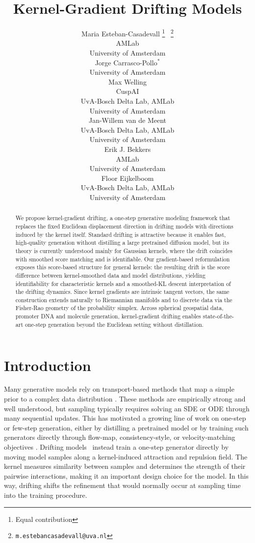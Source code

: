 \documentclass{article}
\title{Kernel-Gradient Drifting Models}
\author{%
  Maria Esteban-Casadevall \thanks{Equal contribution} \, \thanks{ \texttt{m.estebancasadevall@uva.nl}}\\
  AMLab\\
  University of Amsterdam\\
  \And
  Jorge Carrasco-Pollo$^*$  \\
  University of Amsterdam \\
   \AND
   Max Welling \\
   CuspAI \\
  UvA-Bosch Delta Lab, AMLab \\
  University of Amsterdam \\
   \And
   Jan-Willem van de Meent\\
  UvA-Bosch Delta Lab, AMLab \\
  University of Amsterdam \\
     \And
    Erik J. Bekkers \\
    AMLab \\
    University of Amsterdam \\
   \And
   Floor Eijkelboom \\
  UvA-Bosch Delta Lab, AMLab \\
  University of Amsterdam \\
}
\theoremstyle{plain}
\begin{document}
\maketitle
\begin{abstract}
We propose kernel-gradient drifting, a one-step generative modeling framework that replaces the fixed Euclidean displacement direction in drifting models with directions induced by the kernel itself. Standard drifting is attractive because it enables fast, high-quality generation without distilling a large pretrained diffusion model, but its theory is currently understood mainly for Gaussian kernels, where the drift coincides with smoothed score matching and is identifiable. Our gradient-based reformulation exposes this score-based structure for general kernels: the resulting drift is the score difference between kernel-smoothed data and model distributions, yielding identifiability for characteristic kernels and a smoothed-KL descent interpretation of the drifting dynamics. Since kernel gradients are intrinsic tangent vectors, the same construction extends naturally to Riemannian manifolds and to discrete data via the Fisher-Rao geometry of the probability simplex. Across spherical geospatial data, promoter DNA and molecule generation, kernel-gradient drifting enables state-of-the-art one-step generation beyond the Euclidean setting without distillation.
\end{abstract}


\section{Introduction}
Many generative models rely on transport-based methods that map a simple prior to a complex data distribution \citep{Lipman_2023, Ho2020DenoisingDiffusion, Song2021ScoreBased}. These methods are empirically strong and well understood, but sampling typically requires solving an SDE or ODE through many sequential updates. This has motivated a growing line of work on one-step or few-step generation, either by distilling a pretrained model \citep{Salimans2022ProgressiveDistillation, Luo2023DiffInstruct, Yin_2024_DMD} or by training such generators directly through flow-map, consistency-style, or velocity-matching objectives \citep{boffi2025flowmap,boffi2025howto, Davis_2026_GFM, Roos_2026_CatFlowMaps, Geng2025MeanFlows, Geng2025ImprovedMeanFlows, Zhou2025TerminalVelocityMatching}. Drifting models~\citep{Deng_2026_Drift} instead train a one-step generator directly by moving model samples along a kernel-induced attraction and repulsion field. The kernel measures similarity between samples and determines the strength of their pairwise interactions, making it an important design choice for the model. In this way, drifting shifts the refinement that would normally occur at sampling time into the training procedure.
\end{document}

